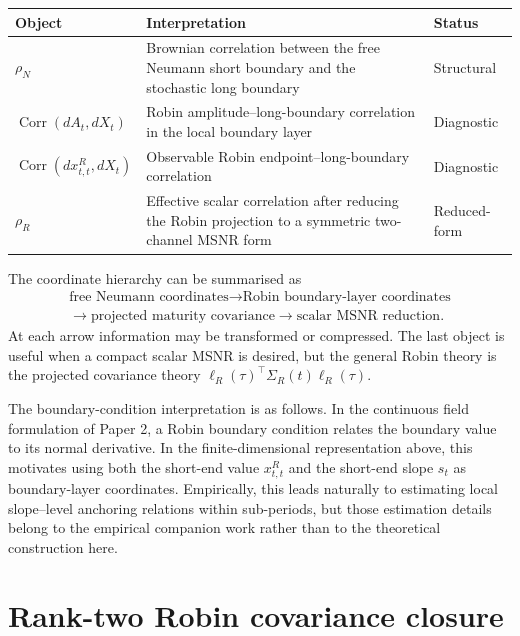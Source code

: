 \documentclass[11pt]{article}
\numberwithin{equation}{section}
\begin{document}
\begin{center}
\begin{tabular}{p{}p{}p{}}
\hline
Object & Interpretation & Status \\
\hline
\(\rho_N\) & Brownian correlation between the free Neumann short boundary and the stochastic long boundary & Structural \\
\(\operatorname{Corr}(dA_t,dX_t)\) & Robin amplitude--long-boundary correlation in the local boundary layer & Diagnostic \\
\(\operatorname{Corr}(dx^R_{t,t},dX_t)\) & Observable Robin endpoint--long-boundary correlation & Diagnostic \\
\(\rho_R\) & Effective scalar correlation after reducing the Robin projection to a symmetric two-channel MSNR form & Reduced-form \\
\hline
\end{tabular}
\end{center}

The coordinate hierarchy can be summarised as
\[
\begin{gathered}
\text{free Neumann coordinates}
\longrightarrow
\text{Robin boundary-layer coordinates} \\
\longrightarrow
\text{projected maturity covariance}
\longrightarrow
\text{scalar MSNR reduction}.
\end{gathered}
\]
At each arrow information may be transformed or compressed. The last object is useful when a compact scalar MSNR is desired, but the general Robin theory is the projected covariance theory \(\ell_R(\tau)^\top\Sigma_R(t)\ell_R(\tau)\).

The boundary-condition interpretation is as follows. In the continuous field formulation of Paper 2, a Robin boundary condition relates the boundary value to its normal derivative. In the finite-dimensional representation above, this motivates using both the short-end value \(x^R_{t,t}\) and the short-end slope \(s_t\) as boundary-layer coordinates. Empirically, this leads naturally to estimating local slope--level anchoring relations within sub-periods, but those estimation details belong to the empirical companion work rather than to the theoretical construction here.

\section{Rank-two Robin covariance closure}
\label{sec:rank-two-robin-covariance}
\end{document}
